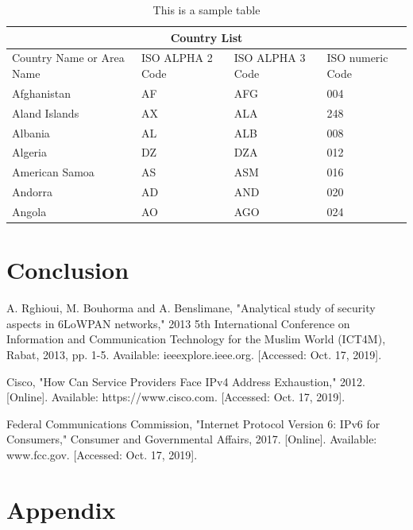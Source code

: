 \documentclass[12pt]{article}
\begin{document}
\begin{table}[H]
\centering
\begin{tabular}{ |p{3cm}||p{3cm}|p{3cm}|p{3cm}|  }
 \hline
 \multicolumn{4}{|c|}{Country List} \\
 \hline
 Country Name     or Area Name& ISO ALPHA 2 Code &ISO ALPHA 3 Code&ISO numeric Code\\
 \hline
 Afghanistan   & AF    &AFG&   004\\
 Aland Islands&   AX  & ALA   &248\\
 Albania &AL & ALB&  008\\
 Algeria    &DZ & DZA&  012\\
 American Samoa&   AS  & ASM&016\\
 Andorra& AD  & AND   &020\\
 Angola& AO  & AGO&024\\
 \hline
\end{tabular}
\caption{This is a sample table}
\label{tab:1}
\end{table}

\lipsum[8]





\section{Conclusion}
\lipsum[9]



\newpage

\begin{thebibliography}{99}

 A. Rghioui, M. Bouhorma and A. Benslimane, "Analytical study of security aspects in 6LoWPAN networks," 2013 5th International Conference on Information and Communication Technology for the Muslim World (ICT4M), Rabat, 2013, pp. 1-5. Available: ieeexplore.ieee.org. [Accessed: Oct. 17, 2019].

 Cisco, "How Can Service Providers Face IPv4 Address Exhaustion," 2012. [Online]. Available: https://www.cisco.com. [Accessed: Oct. 17, 2019].

 Federal Communications Commission, "Internet Protocol Version 6: IPv6 for Consumers,"  Consumer and Governmental Affairs, 2017. [Online]. Available: www.fcc.gov. [Accessed: Oct. 17, 2019].


\end{thebibliography}

\newpage

\section*{Appendix}
\end{document}
